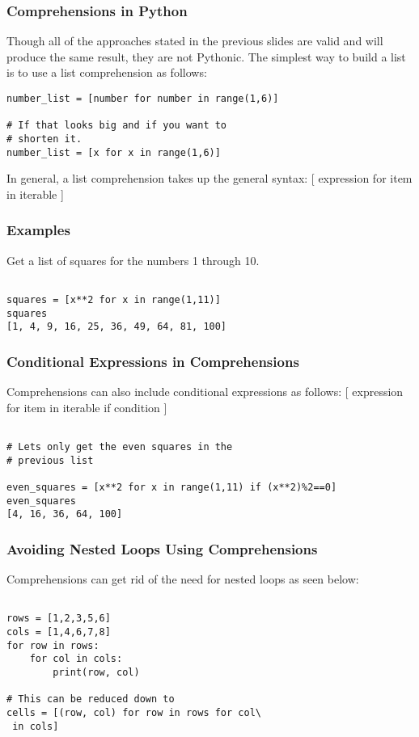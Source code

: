 \documentclass{beamer}
\begin{document}
\begin{frame}[fragile]
\frametitle{Comprehensions in Python}
Though all of the approaches stated in the previous slides are valid and will produce the same result, they are not Pythonic. The simplest way to build a list is to use a list comprehension as follows:
\begin{lstlisting}
number_list = [number for number in range(1,6)]

# If that looks big and if you want to 
# shorten it.
number_list = [x for x in range(1,6)]

\end{lstlisting}

In general, a list comprehension takes up the general syntax:
[ expression for item in iterable ]
\end{frame}

\begin{frame}[fragile]
\frametitle{Examples}
Get a list of squares for the numbers 1 through 10.
\begin{lstlisting}

squares = [x**2 for x in range(1,11)]
squares
[1, 4, 9, 16, 25, 36, 49, 64, 81, 100]

\end{lstlisting}

\end{frame}

\begin{frame}[fragile]
\frametitle{Conditional Expressions in Comprehensions}
Comprehensions can also include conditional expressions as follows:
[ expression for item in iterable if condition ]
\begin{lstlisting}

# Lets only get the even squares in the
# previous list

even_squares = [x**2 for x in range(1,11) if (x**2)%2==0]
even_squares
[4, 16, 36, 64, 100]

\end{lstlisting}

\end{frame}

\begin{frame}[fragile]
\frametitle{Avoiding Nested Loops Using Comprehensions}
Comprehensions can get rid of the need for nested loops as seen below:
\begin{lstlisting}

rows = [1,2,3,5,6]
cols = [1,4,6,7,8]
for row in rows:
    for col in cols:
        print(row, col)
        
# This can be reduced down to
cells = [(row, col) for row in rows for col\
 in cols]

\end{lstlisting}

\end{frame}
\end{document}
